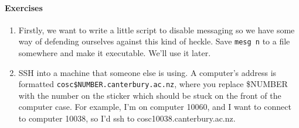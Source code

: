 \documentclass{article}
\begin{document}
\paragraph{Exercises}
\begin{enumerate}
\item Firstly, we want to write a little script to disable messaging so we have some way of defending ourselves against this kind of heckle. Save \texttt{mesg n} to a file somewhere and make it executable. We'll use it later.
\item SSH into a machine that someone else is using. A computer's address is formatted \texttt{cosc\$NUMBER.canterbury.ac.nz}, where you replace \$NUMBER with the number on the sticker which should be stuck on the front of the computer case. For example, I'm on computer 10060, and I want to connect to computer 10038, so I'd ssh to cosc10038.canterbury.ac.nz.


\end{enumerate}
\end{document}
